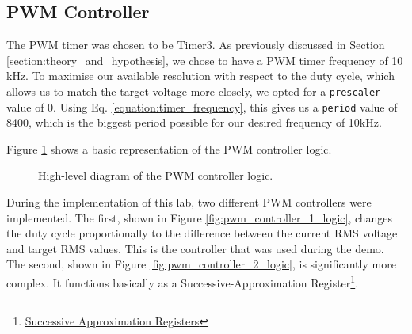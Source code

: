 \subsection{PWM Controller}



The PWM timer was chosen to be Timer3. As previously discussed in Section \ref{section:theory_and_hypothesis}, we chose to have a PWM timer frequency of 10 kHz. To maximise our available resolution with respect to the duty cycle, which allows us to match the target voltage more closely, we opted for a \verb|prescaler| value of 0. Using Eq. \ref{equation:timer_frequency}, this gives us a \verb|period| value of 8400, which is the biggest period possible for our desired frequency of 10kHz.



Figure \ref{fig:pwm_controller_logic} shows a basic representation of the PWM controller logic. 

\begin{figure}[h]
\caption{\label{fig:pwm_controller_logic}High-level diagram of the PWM controller logic.}
\end{figure}


During the implementation of this lab, two different PWM controllers were implemented. The first, shown in Figure \ref{fig:pwm_controller_1_logic}, changes the duty cycle proportionally to the difference between the current RMS voltage and target RMS values. This is the controller that was used during the demo. The second, shown in Figure \ref{fig:pwm_controller_2_logic}, is significantly more complex. It functions basically as a Successive-Approximation Register\footnote{\href{https://www.maximintegrated.com/en/app-notes/index.mvp/id/1080}{Successive Approximation Registers}}. 


